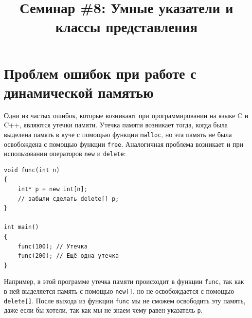 \documentclass{article}
\begin{document}


\title{Семинар \#8: Умные указатели и классы представления \vspace{-5ex}}\date{}\maketitle

\section*{Проблем ошибок при работе с динамической памятью}
Одни из частых ошибок, которые возникают при программировании на языке C и C++, являются утечки памяти. Утечка памяти возникает тогда, когда была выделена память в куче с помощью функции \texttt{malloc}, но эта память не была освобождена с помощью функции \texttt{free}. Аналогичная проблема возникает и при использовании операторов \texttt{new} и \texttt{delete}:
\begin{lstlisting}
void func(int n) 
{
    int* p = new int[n];
    // забыли сделать delete[] p;
}

int main() 
{
    func(100); // Утечка
    func(200); // Ещё одна утечка
}
\end{lstlisting}

Например, в этой программе утечка памяти происходит в функции \texttt{func}, так как в ней выделяется память с помощью \texttt{new[]}, но не освобождается с помощью \texttt{delete[]}. После выхода из функции \texttt{func} мы не сможем освободить эту память, даже если бы хотели, так как мы не знаем чему равен указатель \texttt{p}.
\end{document}
